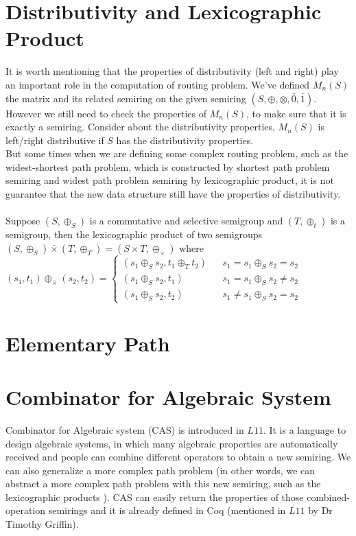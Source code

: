 \documentclass[a4paper,12pt,twoside,openright]{report}
\begin{document}
\section{Distributivity and Lexicographic Product}
It is worth mentioning that the properties of distributivity (left and right) play an important role in the computation of routing problem.
We've defined $M_n(S)$ the matrix and its related semiring on the given semiring $(S,\oplus,\otimes,\bar0,\bar1)$.
However we still need to check the properties of $M_n(S)$, to make sure that it is exactly a semiring.
Consider about the distributivity properties, $M_n(S)$ is left/right distributive if $S$ has the distributivity properties.\\
But some times when we are defining some complex routing problem, such as the widest-shortest path problem, which is constructed by shortest path problem semiring and widest path problem semiring by lexicographic product, it is not guarantee that the new data structure still have the properties of distributivity.\\\\
Suppose $(S,\oplus_S)$ is a commutative and selective semigroup and $(T,\oplus_t)$ is a semigroup, then the lexicographic product of two semigroups $(S,\oplus_S) \bar{\times} (T,\oplus_T) = (S\times T, \oplus_{\bar{\times}})$ where\\
$(s_1,t_1) \oplus_{\bar{\times}} (s_2,t_2)=\left\{
\begin{array}{rcl}
(s_1\oplus_S s_2,t_1\oplus_T t_2)      &      & { s_1 = s_1 \oplus_S s_2 = s_2}\\
(s_1\oplus_S s_2,t_1)       &      & {s_1 = s_1 \oplus_S s_2 \neq s_2}\\
(s_1\oplus_S s_2,t_2)       &      & {s_1 \neq s_1 \oplus_S s_2 = s_2}
\end{array} \right.$\\

\section{Elementary Path}


\section{Combinator for Algebraic System}
Combinator for Algebraic system (CAS)\cite{griffin_metarouting_2005} is introduced in $L11$. It is a language to design algebraic systems, in which many algebraic properties are automatically received and people can combine different operators to obtain a new semiring\cite{griffin_metarouting_2005}. We can also generalize a more complex path problem (in other words, we can abstract a more complex path problem with this new semiring, such as the lexicographic products \cite{gurney_lexicographic_2007}). CAS can easily return the properties of those combined-operation semirings and it is already defined in Coq\cite{Coq} (mentioned in $L11$ by Dr Timothy Griffin).
\end{document}
